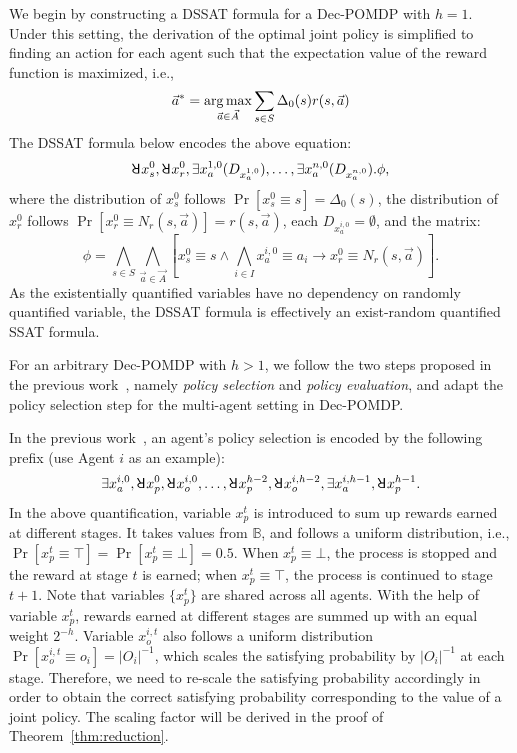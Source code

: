 We begin by constructing a DSSAT formula for a Dec-POMDP with $h=1$.
Under this setting, the derivation of the optimal joint policy is simplified to finding an action for each agent such that the expectation value of the reward function is maximized, i.e.,
\[
    \vec{a}^*=\operatorname*{arg\,max}_{\vec{a}\in \vec{A}}\sum_{s\in S}\Delta_0(s)r(s,\vec{a})
\]
The DSSAT formula below encodes the above equation:
\[
    \random{} x_s^0,\random{} x_r^0,\exists x_a^{1,0}(D_{x_a^{1,0}}),\ldots,\exists x_a^{n,0}(D_{x_a^{n,0}}).\phi,
\]
where the distribution of $x_s^0$ follows $\Pr[x_s^0 \equiv s]=\Delta_0(s)$, the distribution of $x_r^0$ follows $\Pr[x_r^0 \equiv N_r(s,\vec{a})]=r(s,\vec{a})$, each $D_{x_a^{i,0}}=\emptyset$, and the matrix:
\[
    \phi=\bigwedge_{s\in S}\bigwedge_{\vec{a}\in\vec{A}}[x_s^0\equiv s\wedge\bigwedge_{i\in I} x_a^{i,0}\equiv a_i\rightarrow x_r^0\equiv N_r(s,\vec{a})].
\]
As the existentially quantified variables have no dependency on randomly quantified variable, the DSSAT formula is effectively an exist-random quantified SSAT formula.

For an arbitrary Dec-POMDP with $h>1$, we follow the two steps proposed in the previous work~\cite{Salmon2020}, namely \textit{policy selection} and \textit{policy evaluation}, and adapt the policy selection step for the multi-agent setting in Dec-POMDP.

In the previous work~\cite{Salmon2020}, an agent's policy selection is encoded by the following prefix (use Agent $i$ as an example):
\[
    \exists x_a^{i,0},\random{} x_p^0,\random{} x_o^{i,0},\ldots,\random{} x_p^{h-2},\random{} x_o^{i,h-2},\exists x_a^{i,h-1},\random{} x_p^{h-1}.
\]
In the above quantification, variable $x_p^t$ is introduced to sum up rewards earned at different stages.
It takes values from $\mathbb{B}$, and follows a uniform distribution, i.e., $\Pr[x_p^t \equiv \top]=\Pr[x_p^t \equiv \bot]=0.5$.
When $x_p^t \equiv \bot$, the process is stopped and the reward at stage $t$ is earned; when $x_p^t \equiv \top$, the process is continued to stage $t+1$.
Note that variables $\{x_p^t\}$ are shared across all agents.
With the help of variable $x_p^t$, rewards earned at different stages are summed up with an equal weight $2^{-h}$.
Variable $x_o^{i,t}$ also follows a uniform distribution $\Pr[x_o^{i,t} \equiv o_i]=|O_i|^{-1}$, which scales the satisfying probability by $|O_i|^{-1}$ at each stage.
Therefore, we need to re-scale the satisfying probability accordingly in order to obtain the correct satisfying probability corresponding to the value of a joint policy.
The scaling factor will be derived in the proof of Theorem~\ref{thm:reduction}.

